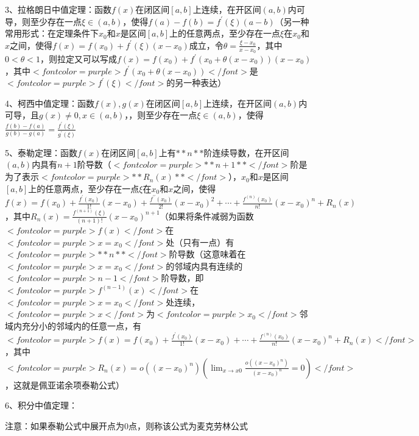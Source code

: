 3、拉格朗日中值定理：函数$ f(x) $在闭区间$ [a,b] $上连续，在开区间$ (a,b) $内可导，则至少存在一点$ \xi \in(a, b) $，使得$ f(a)-f(b)=f^{\prime}(\xi)(a-b) $（另一种常用形式：在定理条件下$ x_0 $和$ x $是区间$ [a,b] $上的任意两点，至少存在一点$ \xi $在$ x_0 $和$ x $之间，使得$ f(x)=f\left(x_{0}\right)+f^{\prime}(\xi)\left(x-x_{0}\right) $成立，令$ \theta = \frac{\xi - x_0}{x-x_0} $，其中$ 0< \theta < 1 $，则拉定又可以写成$ f(x)=f\left(x_{0}\right)+f^{\prime}\left(x_{0}+\theta\left(x-x_{0}\right)\right)\left(x-x_{0}\right) $，其中$ <font color=purple>f^{\prime}\left(x_{0}+\theta\left(x-x_{0}\right)\right)</font> $是$ <font color=purple>f^{\prime}(\xi)</font> $的另一种表达）

4、柯西中值定理：函数$ f(x),g(x) $在闭区间$ [a,b] $上连续，在开区间$ (a,b) $内可导，且$ g(x)\ne 0,x \in(a, b) $，，则至少存在一点$ \xi \in(a, b) $，使得$ \frac{f(b)-f(a)}{g(b)-g(a)}=\frac{f^{\prime}(\xi)}{g^{\prime}(\xi)} $

5、泰勒定理：函数$ f(x) $在闭区间$ [a,b] $上有$ **n** $阶连续导数，在开区间$ (a,b) $内具有$ n+1 $阶导数（$ <font color=purple>**n+1**</font> $阶是为了表示$ <font color=purple>**R_{n}(x)**</font> $），$ x_0 $和$ x $是区间$ [a,b] $上的任意两点，至少存在一点$ \xi $在$ x_0 $和$ x $之间，使得$ f(x)=f\left(x_{0}\right)+\frac{f^{\prime}\left(x_{0}\right)}{1 !}\left(x-x_{0}\right)+\frac{f^{\prime \prime}\left(x_{0}\right)}{2 !}\left(x-x_{0}\right)^{2}+\cdots+\frac{f^{(n)}\left(x_{0}\right)}{n !}\left(x-x_{0}\right)^{n}+R_{n}(x) $，其中$ R_{n}(x)=\frac{f^{(n+1)}(\xi)}{(n+1) !}\left(x-x_{0}\right)^{n+1} $（如果将条件减弱为函数$ <font color=purple>f(x)</font> $在$ <font color=purple>x=x_0</font> $处（只有一点）有$ <font color=purple>**n**</font> $阶导数（这意味着在$ <font color=purple>x=x_0</font> $的邻域内具有连续的$ <font color=purple>n-1</font> $阶导数，即$ <font color=purple>f^{(n-1)}(x)</font> $在$ <font color=purple>x=x_0</font> $处连续，$ <font color=purple>x</font> $为$ <font color=purple>x_0</font> $邻域内充分小的邻域内的任意一点，有$ <font color=purple>f(x)=f\left(x_{0}\right)+\frac{f^{\prime}\left(x_{0}\right)}{1 !}\left(x-x_{0}\right)+\cdots+\frac{f^{(n)}\left(x_{0}\right)}{n !}\left(x-x_{0}\right)^{n}+R_{n}(x)</font> $，其中$ <font color=purple>R_{n}(x)=o\left(\left(x-x_{0}\right)^{n}\right)\left(\lim_ {x \rightarrow x{0}} \frac{o\left(\left(x-x_{0}\right)^{n}\right)}{\left(x-x_{0}\right)^{n}}=0\right)</font> $，这就是佩亚诺余项泰勒公式）

6、积分中值定理：

注意：如果泰勒公式中展开点为0点，则称该公式为麦克劳林公式

